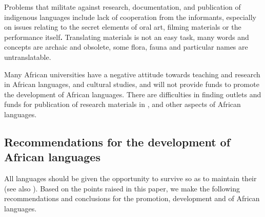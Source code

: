 \documentclass[output=paper,
modfonts
]{langscibook}
\begin{document}
Problems that militate against research, documentation, and publication of indigenous languages include lack of cooperation from the informants, especially on issues relating to the secret elements of oral art, filming materials or the performance itself\textbf{. }Translating  materials is not an easy task, many words and concepts are archaic and obsolete, some flora, fauna and particular names are untranslatable. 

Many African universities have a negative attitude towards teaching and research in African languages,  and cultural studies, and will not provide funds to promote the development of African languages. There are difficulties in finding outlets and funds for publication of research materials in ,  and other aspects of African languages. 

\subsection{Recommendations for the development of African languages }

All languages should be given the opportunity to survive so as to maintain their  (see also \citealt[305--306]{Adegbija2001}). Based on the points raised in this paper, we make the following recommendations and conclusions for the promotion, development and  of African languages.
\end{document}
